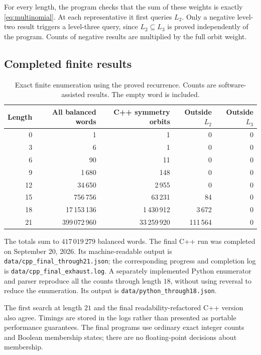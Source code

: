 \documentclass[11pt,letterpaper]{article}
\numberwithin{equation}{section}
\theoremstyle{definition}
\theoremstyle{remark}
\newcommand{\word}[1]{\texttt{#1}}
\begin{document}
For every length, the program checks that the sum of these weights is
exactly \eqref{eq:multinomial}. At each representative it first queries
\(L_2\). Only a negative level-two result triggers a level-three
query, since \(L_2\subseteq L_3\) is proved independently of the
program. Counts of negative results are multiplied by the full orbit
weight.

\subsection{Completed finite results}
\begin{table}[htbp]
\centering
\small
\begin{tabular}{rrrrr}
\toprule
Length & All balanced words & C++ symmetry orbits & Outside \(L_2\) & Outside \(L_3\)\\
\midrule
0  & 1               & 1              & 0          & 0\\
3  & 6               & 1              & 0          & 0\\
6  & 90              & 11             & 0          & 0\\
9  & 1\,680          & 148            & 0          & 0\\
12 & 34\,650         & 2\,955         & 0          & 0\\
15 & 756\,756        & 63\,231        & 84         & 0\\
18 & 17\,153\,136    & 1\,430\,912    & 3\,672     & 0\\
21 & 399\,072\,960   & 33\,259\,920   & 111\,564   & 0\\
\bottomrule
\end{tabular}
\caption{Exact finite enumeration using the proved recurrence. Counts are
software-assisted results. The empty word is included.}
\label{tab:results}
\end{table}

The totals sum to \(417\,019\,279\) balanced words. The final C++ run
was completed on September 20, 2026. Its machine-readable output is
\word{data/cpp\_final\_through21.json}; the corresponding progress and
completion log is \word{data/cpp\_final\_exhaust.log}. A separately
implemented Python enumerator and parser reproduce all the counts through
length \(18\), without using reversal to reduce the enumeration.
Its output is \word{data/python\_through18.json}.

The first search at length \(21\) and the final readability-refactored
C++ version also agree. Timings are stored in the logs rather than
presented as portable performance guarantees. The final programs use
ordinary exact integer counts and Boolean membership states; there
are no floating-point decisions about membership.
\end{document}
